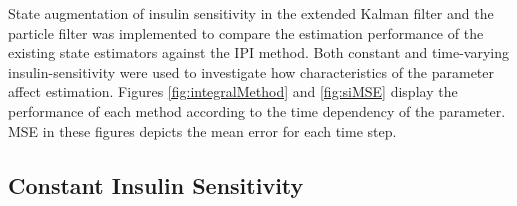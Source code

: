 \documentclass[nomenclature, english, bibtex]{kththesis}
\begin{document}
State augmentation of insulin sensitivity in the extended Kalman filter and the particle filter was implemented to compare the estimation performance of the existing state estimators against the \gls{IPI} method. Both constant and time-varying insulin-sensitivity were used to investigate how characteristics of the parameter affect estimation. Figures \ref{fig:integralMethod} and \ref{fig:siMSE} display the performance of each method according to the time dependency of the parameter. MSE in these figures depicts the mean error for each time step.


\subsection{Constant Insulin Sensitivity}
\end{document}
